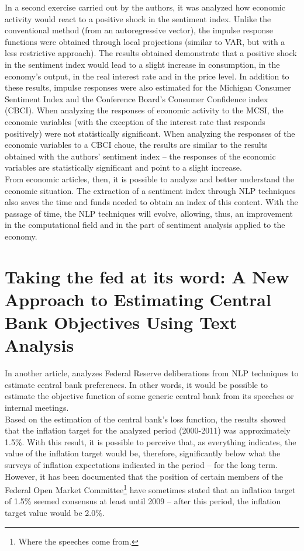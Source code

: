 In a second exercise carried out by the authors, it was analyzed how economic activity would react to a positive shock in the sentiment index. Unlike the conventional method (from an autoregressive vector), the impulse response functions were obtained through local projections \cite{jorda2005estimation} (similar to VAR, but with a less restrictive approach). The results obtained demonstrate that a positive shock in the sentiment index would lead to a slight increase in consumption, in the economy's output, in the real interest rate and in the price level. In addition to these results, impulse responses were also estimated for the Michigan Consumer Sentiment Index and the Conference Board's Consumer Confidence index (CBCI). When analyzing the responses of economic activity to the MCSI, the economic variables (with the exception of the interest rate that responds positively) were not statistically significant. When analyzing the responses of the economic variables to a CBCI choue, the results are similar to the results obtained with the authors' sentiment index -- the responses of the economic variables are statistically significant and point to a slight increase.\\

From economic articles, then, it is possible to analyze and better understand the economic situation. The extraction of a sentiment index through NLP techniques also saves the time and funds needed to obtain an index of this content. With the passage of time, the NLP techniques will evolve, allowing, thus, an improvement in the computational field and in the part of sentiment analysis applied to the economy.\\

\section{Taking the fed at its word: A New Approach to Estimating Central Bank Objectives Using Text Analysis}

In another article, \cite{shapiro2021taking} analyzes Federal Reserve deliberations from NLP techniques to estimate central bank preferences. In other words, it would be possible to estimate the objective function of some generic central bank from its speeches or internal meetings.\\

Based on the estimation of the central bank's loss function, the results showed that the inflation target for the analyzed period (2000-2011) was approximately 1.5\%. With this result, it is possible to perceive that, as everything indicates, the value of the inflation target would be, therefore, significantly below what the surveys of inflation expectations indicated in the period -- for the long term. However, it has been documented \cite[p.32]{shapiro2021taking} that the position of certain members of the Federal Open Market Committee\footnote{Where the speeches come from.} have sometimes stated that an inflation target of 1.5\% seemed consensus at least until 2009 -- after this period, the inflation target value would be 2.0\%.\\

